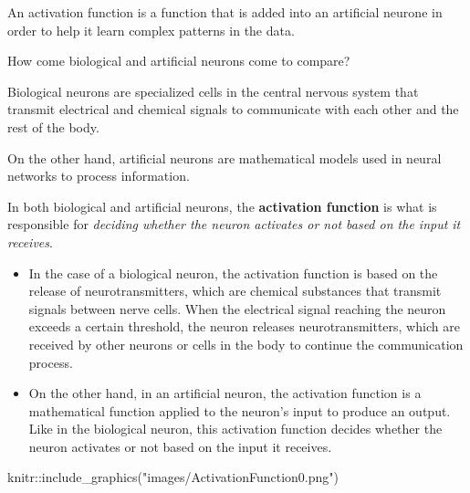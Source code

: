 \documentclass[
  letterpaper,
  DIV=11,
  numbers=noendperiod,
  oneside]{scrartcl}
\newenvironment{Shaded}{\begin{snugshade}}{\end{snugshade}}
\newcommand{\FunctionTok}[1]{\textcolor[rgb]{0.28,0.35,0.67}{#1}}
\newcommand{\NormalTok}[1]{\textcolor[rgb]{0.00,0.23,0.31}{#1}}
\newcommand{\SpecialCharTok}[1]{\textcolor[rgb]{0.37,0.37,0.37}{#1}}
\newcommand{\StringTok}[1]{\textcolor[rgb]{0.13,0.47,0.30}{#1}}
\providecommand{\tightlist}{%
  \setlength{\itemsep}{0pt}\setlength{\parskip}{0pt}}\usepackage{longtable,booktabs,array}
\begin{document}
An activation function is a function that is added into an artificial
neurone in order to help it learn complex patterns in the data.

How come biological and artificial neurons come to compare?

Biological neurons are specialized cells in the central nervous system
that transmit electrical and chemical signals to communicate with each
other and the rest of the body.

On the other hand, artificial neurons are mathematical models used in
neural networks to process information.

In both biological and artificial neurons, the \textbf{activation
function} is what is responsible for \emph{deciding whether the neuron
activates or not based on the input it receives}.

\begin{itemize}
\tightlist
\item
  In the case of a biological neuron, the activation function is based
  on the release of neurotransmitters, which are chemical substances
  that transmit signals between nerve cells. When the electrical signal
  reaching the neuron exceeds a certain threshold, the neuron releases
  neurotransmitters, which are received by other neurons or cells in the
  body to continue the communication process.
\item
  On the other hand, in an artificial neuron, the activation function is
  a mathematical function applied to the neuron's input to produce an
  output. Like in the biological neuron, this activation function
  decides whether the neuron activates or not based on the input it
  receives.
\end{itemize}

\begin{Shaded}
\begin{Highlighting}[]
\NormalTok{knitr}\SpecialCharTok{::}\FunctionTok{include\_graphics}\NormalTok{(}\StringTok{"images/ActivationFunction0.png"}\NormalTok{)}
\end{Highlighting}
\end{Shaded}
\end{document}
